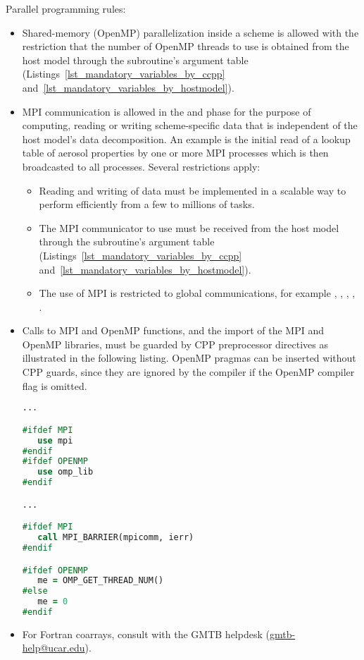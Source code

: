 Parallel programming rules:
\begin{itemize}
\item Shared-memory (OpenMP) parallelization inside a scheme is allowed with the restriction that the number of OpenMP threads to use is obtained from the host model through the subroutine's argument table (Listings~\ref{lst_mandatory_variables_by_ccpp} and~\ref{lst_mandatory_variables_by_hostmodel}).
\item MPI communication is allowed in the  and  phase for the purpose of computing, reading or writing scheme-specific data that is independent of the host model's data decomposition. An example is the initial read of a lookup table of aerosol properties by one or more MPI processes which is then broadcasted to all processes. Several restrictions apply:
\begin{itemize}
    \item Reading and writing of data must be implemented in a scalable way to perform efficiently from a few to millions of tasks.
    \item The MPI communicator to use must be received from the host model through the subroutine's argument table (Listings~\ref{lst_mandatory_variables_by_ccpp} and~\ref{lst_mandatory_variables_by_hostmodel}).
    \item The use of MPI is restricted to global communications, for example , , , , .
\end{itemize}
\item Calls to MPI and OpenMP functions, and the import of the MPI and OpenMP libraries, must be guarded by CPP preprocessor directives as illustrated in the following listing. OpenMP pragmas can be inserted without CPP guards, since they are ignored by the compiler if the OpenMP compiler flag is omitted.
\begin{lstlisting}[language=Fortran]
...

#ifdef MPI
   use mpi
#endif
#ifdef OPENMP
   use omp_lib
#endif

...

#ifdef MPI
   call MPI_BARRIER(mpicomm, ierr)
#endif

#ifdef OPENMP
   me = OMP_GET_THREAD_NUM()
#else
   me = 0
#endif
\end{lstlisting}


\item For Fortran coarrays, consult with the GMTB helpdesk (\url{gmtb-help@ucar.edu}).
\end{itemize}
